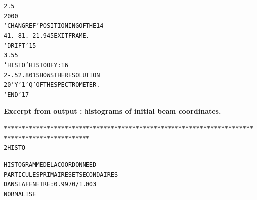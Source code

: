 \begin{tiny}
\begin{center}
\begin{alltt}
 2.5                                                                            
 2 0 0 0                                                                        
 'CHANGREF'                           POSITIONING  OF  THE                   14
 41.  -81.  -21.945                   EXIT  FRAME.                              
 'DRIFT'                                                                     15
 3.55                                                                           
  'HISTO'                             HISTO  OF  Y :                         16
  2  -.5  2.     80  1                SHOWS  THE  RESOLUTION                    
  20  'Y'  1  'Q'                     OF  THE  SPECTROMETER.                    
 'END'                                                                       17
\end{alltt}

\newpage
\noindent \textbf{\normalsize Excerpt from \zgoubi output : histograms of initial beam coordinates.}

\begin{alltt}
**********************************************************************************************
      2  HISTO                         

                      HISTOGRAMME  DE  LA  COORDONNEE    D   
                      PARTICULES  PRIMAIRES  ET  SECONDAIRES
                      DANS  LA  FENETRE :   0.9970     /    1.003          
                      NORMALISE     


\end{alltt}
\end{center}
\end{tiny}
